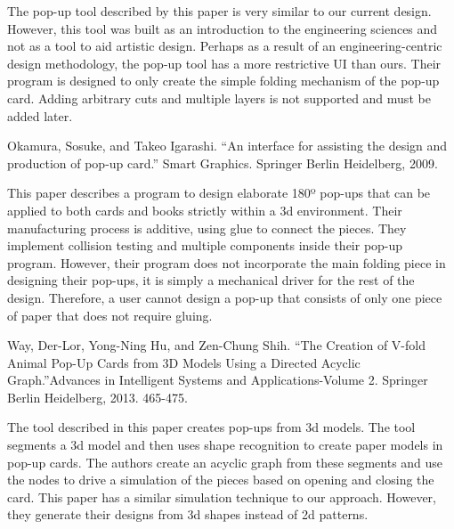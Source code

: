 The pop-up tool described by this paper is very similar to our current
design. However, this tool was built as an introduction to the
engineering sciences and not as a tool to aid artistic design. Perhaps
as a result of an engineering-centric design methodology, the pop-up
tool has a more restrictive UI than ours. Their program is designed to
only create the simple folding mechanism of the pop-up card. Adding
arbitrary cuts and multiple layers is not supported and must be added
later.

Okamura, Sosuke, and Takeo Igarashi. ``An interface for assisting the
design and production of pop-up card.'' Smart Graphics. Springer Berlin
Heidelberg, 2009. \citet{okamura2009interface}

This paper describes a program to design elaborate 180º pop-ups that can
be applied to both cards and books strictly within a 3d environment.
Their manufacturing process is additive, using glue to connect the
pieces. They implement collision testing and multiple components inside
their pop-up program. However, their program does not incorporate the
main folding piece in designing their pop-ups, it is simply a mechanical
driver for the rest of the design. Therefore, a user cannot design a
pop-up that consists of only one piece of paper that does not require
gluing.

Way, Der-Lor, Yong-Ning Hu, and Zen-Chung Shih. ``The Creation of V-fold
Animal Pop-Up Cards from 3D Models Using a Directed Acyclic
Graph.''Advances in Intelligent Systems and Applications-Volume 2.
Springer Berlin Heidelberg, 2013. 465-475. \citet{way2013creation}

The tool described in this paper creates pop-ups from 3d models. The
tool segments a 3d model and then uses shape recognition to create paper
models in pop-up cards. The authors create an acyclic graph from these
segments and use the nodes to drive a simulation of the pieces based on
opening and closing the card. This paper has a similar simulation
technique to our approach. However, they generate their designs from 3d
shapes instead of 2d patterns.
